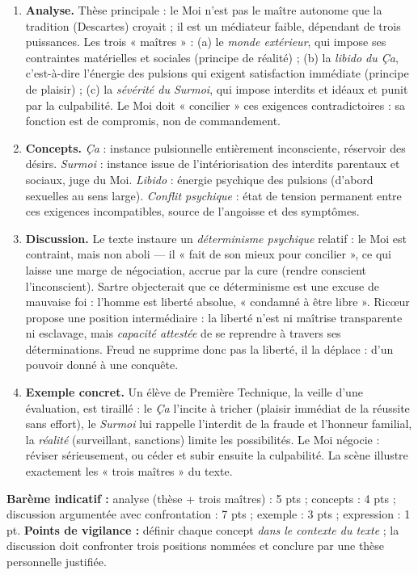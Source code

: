\documentclass[11pt]{article}
\begin{document}
\begin{corrige}
\begin{enumerate}
    \item \textbf{Analyse.} Thèse principale : le Moi n'est pas le maître autonome que la tradition (Descartes) croyait ; il est un médiateur faible, dépendant de trois puissances. Les trois « maîtres » : (a) le \emph{monde extérieur}, qui impose ses contraintes matérielles et sociales (principe de réalité) ; (b) la \emph{libido du Ça}, c'est-à-dire l'énergie des pulsions qui exigent satisfaction immédiate (principe de plaisir) ; (c) la \emph{sévérité du Surmoi}, qui impose interdits et idéaux et punit par la culpabilité. Le Moi doit « concilier » ces exigences contradictoires : sa fonction est de compromis, non de commandement.
    \item \textbf{Concepts.} \emph{Ça} : instance pulsionnelle entièrement inconsciente, réservoir des désirs. \emph{Surmoi} : instance issue de l'intériorisation des interdits parentaux et sociaux, juge du Moi. \emph{Libido} : énergie psychique des pulsions (d'abord sexuelles au sens large). \emph{Conflit psychique} : état de tension permanent entre ces exigences incompatibles, source de l'angoisse et des symptômes.
    \item \textbf{Discussion.} Le texte instaure un \emph{déterminisme psychique} relatif : le Moi est contraint, mais non aboli — il « fait de son mieux pour concilier », ce qui laisse une marge de négociation, accrue par la cure (rendre conscient l'inconscient). Sartre objecterait que ce déterminisme est une excuse de mauvaise foi : l'homme est liberté absolue, « condamné à être libre ». Ricœur propose une position intermédiaire : la liberté n'est ni maîtrise transparente ni esclavage, mais \emph{capacité attestée} de se reprendre à travers ses déterminations. Freud ne supprime donc pas la liberté, il la déplace : d'un pouvoir donné à une conquête.
    \item \textbf{Exemple concret.} Un élève de Première Technique, la veille d'une évaluation, est tiraillé : le \emph{Ça} l'incite à tricher (plaisir immédiat de la réussite sans effort), le \emph{Surmoi} lui rappelle l'interdit de la fraude et l'honneur familial, la \emph{réalité} (surveillant, sanctions) limite les possibilités. Le Moi négocie : réviser sérieusement, ou céder et subir ensuite la culpabilité. La scène illustre exactement les « trois maîtres » du texte.
\end{enumerate}
\textbf{Barème indicatif :} analyse (thèse + trois maîtres) : 5 pts ; concepts : 4 pts ; discussion argumentée avec confrontation : 7 pts ; exemple : 3 pts ; expression : 1 pt.
\textbf{Points de vigilance :} définir chaque concept \emph{dans le contexte du texte} ; la discussion doit confronter trois positions nommées et conclure par une thèse personnelle justifiée.
\end{corrige}
\end{document}

